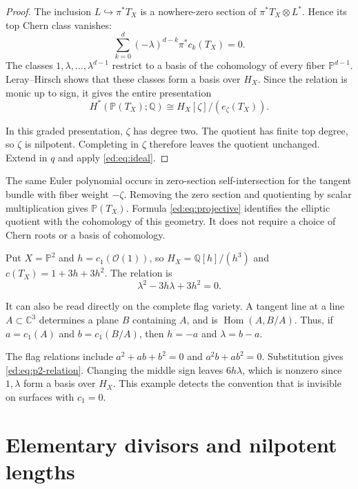 \begin{proof}
The inclusion $L\hookrightarrow\pi^*T_X$ is a nowhere-zero section of
$\pi^*T_X\otimes L^*$. Hence its top Chern class vanishes:
\begin{equation}\label{ed:eq:projective-relation}
 \sum_{k=0}^d(-\lambda)^{d-k}\pi^*c_k(T_X)=0.
\end{equation}
The classes $1,\lambda,\ldots,\lambda^{d-1}$ restrict to a basis of
the cohomology of every fiber $\mathbb P^{d-1}$. Leray--Hirsch shows
that these classes form a basis over $H_X$. Since the relation is monic
up to sign, it gives the entire presentation
\[
 H^*(\mathbb P(T_X);\mathbb Q)
 \cong H_X[\zeta]/(e_\zeta(T_X)).
\]

In this graded presentation, $\zeta$ has degree two. The quotient has
finite top degree, so $\zeta$ is nilpotent. Completing in $\zeta$
therefore leaves the quotient unchanged. Extend in $q$ and apply
\eqref{ed:eq:ideal}.
\end{proof}

The same Euler polynomial occurs in zero-section self-intersection for
the tangent bundle with fiber weight $-\zeta$. Removing the zero section
and quotienting by scalar multiplication gives $\mathbb P(T_X)$.
Formula \eqref{ed:eq:projective} identifies the elliptic quotient with
the cohomology of this geometry. It does not require a choice of Chern
roots or a basis of cohomology.

\begin{example}\label{ed:ex:projective-plane}
Put $X=\mathbb P^2$ and $h=c_1(\mathcal O(1))$, so
$H_X=\mathbb Q[h]/(h^3)$ and $c(T_X)=1+3h+3h^2$. The relation is
\begin{equation}\label{ed:eq:p2-relation}
 \lambda^2-3h\lambda+3h^2=0.
\end{equation}

It can also be read directly on the complete flag variety. A tangent
line at a line $A\subset\mathbb C^3$ determines a plane $B$ containing
$A$, and is $\operatorname{Hom}(A,B/A)$. Thus, if
$a=c_1(A)$ and $b=c_1(B/A)$, then $h=-a$ and $\lambda=b-a$.

The flag relations include
$a^2+ab+b^2=0$ and $a^2b+ab^2=0$. Substitution gives
\eqref{ed:eq:p2-relation}. Changing the middle sign leaves
$6h\lambda$, which is nonzero since $1,\lambda$ form a basis over $H_X$.
This example detects the convention that is invisible
on surfaces with $c_1=0$.
\end{example}

\section{Elementary divisors and nilpotent lengths}
\label{ed:sec:smith}

